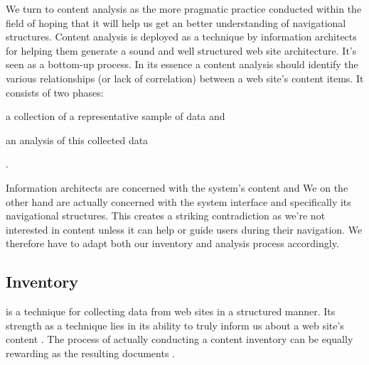 We turn to content analysis as the more pragmatic practice conducted within
the field of %
 hoping that it will help us get an better understanding of navigational
structures.
Content analysis is deployed as a technique by information architects for
helping them generate a sound and well structured web site architecture.
It's seen as a bottom-up process.
In its essence a content analysis should identify the various
relationships (or lack of correlation) between a web site's content items.
It consists of two phases:
\begin{inparaenum}[(i)]
  \item a collection of a representative sample of data and
  \item an analysis of this collected data
\end{inparaenum}
\citep[]{morville06}.

Information architects are concerned with
the system's content and
We on the other hand are actually concerned with the system interface and
specifically its navigational structures. This creates a striking
contradiction as we're not interested in content unless it can help or
guide users during their navigation. We therefore have to adapt
both our inventory and analysis process accordingly.

\subsection{Inventory}

 is a technique for collecting data from web sites
in a structured manner. Its strength as a technique lies in its ability to
truly inform us about a web site's content \citep{wodtke02}. The process of
actually conducting a content inventory can be equally rewarding as the
resulting documents \citep{veen02}.

